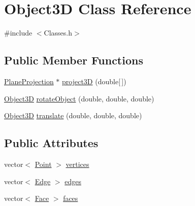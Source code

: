 \hypertarget{class_object3_d}{}\section{Object3D Class Reference}
\label{class_object3_d}


{\ttfamily \#include $<$Classes.\+h$>$}

\subsection*{Public Member Functions}
\begin{DoxyCompactItemize}
\item 
\hyperlink{class_plane_projection}{Plane\+Projection} $\ast$ \hyperlink{class_object3_d_a7767ac8b73a117c8cd8cbdaf7c6f4699}{project3D} (double\mbox{[}$\,$\mbox{]})
\item 
\hyperlink{class_object3_d}{Object3D} \hyperlink{class_object3_d_a476b3de610cb30be0b050b4701ba4701}{rotate\+Object} (double, double, double)
\item 
\hyperlink{class_object3_d}{Object3D} \hyperlink{class_object3_d_afb299c53794e9f4fb708efbde24c9a21}{translate} (double, double, double)
\end{DoxyCompactItemize}
\subsection*{Public Attributes}
\begin{DoxyCompactItemize}
\item 
vector$<$ \hyperlink{class_point}{Point} $>$ \hyperlink{class_object3_d_a225a5c970a1d3d343fc495764ccc3cfd}{vertices}
\item 
vector$<$ \hyperlink{class_edge}{Edge} $>$ \hyperlink{class_object3_d_ad1d85cb131bbc39c772dc5badd0ec1c0}{edges}
\item 
vector$<$ \hyperlink{class_face}{Face} $>$ \hyperlink{class_object3_d_a58677f390d3ba13026e68f4b2a530580}{faces}
\end{DoxyCompactItemize}
